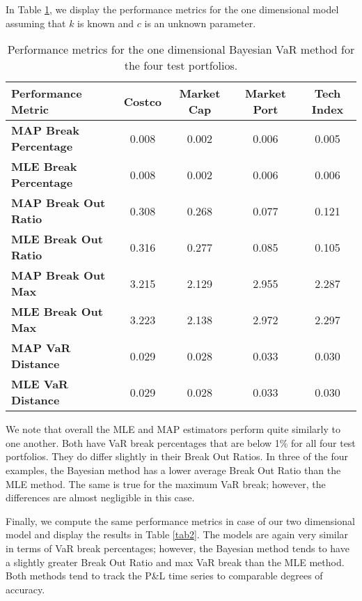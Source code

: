 \documentclass{amsart}
\begin{document}
In Table \ref{tab1}, we display the performance metrics for the one dimensional 
model assuming that $k$ is known and $c$ is an unknown parameter.  
\begin{table}
    \centering
\begin{normalsize}\begin{tabular}{|l|c|c|c|c|}
\hline
\textbf{Performance Metric}&\textbf{Costco}&\textbf{Market Cap}&\textbf{Market Port}&\textbf{Tech Index}\\\hline
\textbf{MAP Break Percentage}&0.008&0.002&0.006&0.005\\\hline
\textbf{MLE Break Percentage}&0.008&0.002&0.006&0.006\\\hline
\textbf{MAP Break Out Ratio}&0.308&0.268&0.077&0.121\\\hline
\textbf{MLE Break Out Ratio}&0.316&0.277&0.085&0.105\\\hline
\textbf{MAP Break Out Max}&3.215&2.129&2.955&2.287\\\hline
\textbf{MLE Break Out Max}&3.223&2.138&2.972&2.297\\\hline
\textbf{MAP VaR Distance}&0.029&0.028&0.033&0.030\\\hline
\textbf{MLE VaR Distance}&0.029&0.028&0.033&0.030\\\hline
\end{tabular}
\end{normalsize}
\hspace{10pt}
\caption{Performance metrics for the one dimensional Bayesian VaR method for the four 
test portfolios.}
\label{tab1}
\end{table}
We note that overall the MLE and MAP estimators perform quite similarly to one another.  Both have 
VaR break percentages that are below 1\% for all four test portfolios.  They do differ slightly 
in their Break Out Ratios.  In three of the four examples, the Bayesian method has a 
lower average Break Out Ratio than the MLE method. The same is true for the maximum VaR 
break; however, the differences are almost negligible in this case.

Finally, we compute the same performance metrics in case of our two dimensional 
model and display the results in Table \ref{tab2}.  The models are again 
very similar in terms of VaR break percentages; however, the Bayesian method tends to 
have a slightly greater Break Out Ratio and max VaR break than the MLE method.  Both 
methods tend to track the P\&L time series to comparable degrees of accuracy. 
\end{document}
